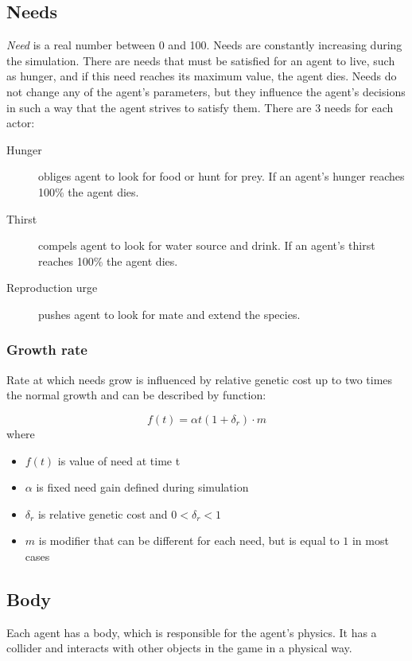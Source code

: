 \subsection{Needs}
\label{needsDefinition}
\emph{Need} is a real number between 0 and 100. Needs are constantly increasing during the simulation. There are needs that must be satisfied for an agent to live, such as hunger, and if this need reaches its maximum value, the agent dies. Needs do not change any of the agent's parameters, but they influence the agent's decisions in such a way that the agent strives to satisfy them. There are 3 needs for each actor:
\begin{description}
    \item[Hunger] obliges agent to look for food or hunt for prey. If an agent's hunger reaches 100\% the agent dies.
    \item[Thirst] compels agent to look for water source and drink. If an agent's thirst reaches 100\% the agent dies.
    \item[Reproduction urge] pushes agent to look for mate and extend the species.
\end{description}

\subsubsection{Growth rate}
Rate at which needs grow is influenced by relative genetic cost up to two times the normal growth and can be described by function:

\begin{equation}
    f(t) = \alpha t (1 + \delta_r) \cdot m
\end{equation}
where
\begin{itemize}
    \item $f(t)$ is value of need at time t
    \item $\alpha$ is fixed need gain defined during simulation
    \item $\delta_r$ is relative genetic cost and $0 < \delta_r < 1$
    \item $m$ is modifier that can be different for each need, but is equal to $1$ in most cases
\end{itemize}

\subsection{Body}
Each agent has a body, which is responsible for the agent's physics. It has a collider and interacts with other objects in the game in a physical way.

